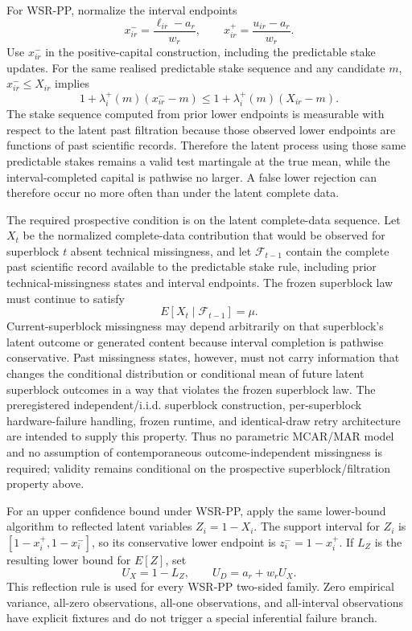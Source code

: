 \documentclass[11pt,a4paper]{article}
\begin{document}
For WSR-PP, normalize the interval endpoints
\[
x_{ir}^-=\frac{\ell_{ir}-a_r}{w_r},\qquad
x_{ir}^+=\frac{u_{ir}-a_r}{w_r}.
\]
Use $x_{ir}^-$ in the positive-capital construction, including the predictable stake updates. For the same realised predictable stake sequence and any candidate $m$, $x_{ir}^-\le X_{ir}$ implies
\[
1+\lambda_i^+(m)(x_{ir}^- -m)\le
1+\lambda_i^+(m)(X_{ir}-m).
\]
The stake sequence computed from prior lower endpoints is measurable with respect to the latent past filtration because those observed lower endpoints are functions of past scientific records. Therefore the latent process using those same predictable stakes remains a valid test martingale at the true mean, while the interval-completed capital is pathwise no larger. A false lower rejection can therefore occur no more often than under the latent complete data.

The required prospective condition is on the latent complete-data sequence. Let $X_t$ be the normalized complete-data contribution that would be observed for superblock $t$ absent technical missingness, and let $\mathcal F_{t-1}$ contain the complete past scientific record available to the predictable stake rule, including prior technical-missingness states and interval endpoints. The frozen superblock law must continue to satisfy
\[
E[X_t\mid\mathcal F_{t-1}]=\mu.
\]
Current-superblock missingness may depend arbitrarily on that superblock's latent outcome or generated content because interval completion is pathwise conservative. Past missingness states, however, must not carry information that changes the conditional distribution or conditional mean of future latent superblock outcomes in a way that violates the frozen superblock law. The preregistered independent/i.i.d. superblock construction, per-superblock hardware-failure handling, frozen runtime, and identical-draw retry architecture are intended to supply this property. Thus no parametric MCAR/MAR model and no assumption of contemporaneous outcome-independent missingness is required; validity remains conditional on the prospective superblock/filtration property above.

For an upper confidence bound under WSR-PP, apply the same lower-bound algorithm to reflected latent variables $Z_i=1-X_i$. The support interval for $Z_i$ is $[1-x_i^+,1-x_i^-]$, so its conservative lower endpoint is $z_i^-=1-x_i^+$. If $L_Z$ is the resulting lower bound for $E[Z]$, set
\[
U_X=1-L_Z,\qquad U_D=a_r+w_rU_X.
\]
This reflection rule is used for every WSR-PP two-sided family. Zero empirical variance, all-zero observations, all-one observations, and all-interval observations have explicit fixtures and do not trigger a special inferential failure branch.
\end{document}
